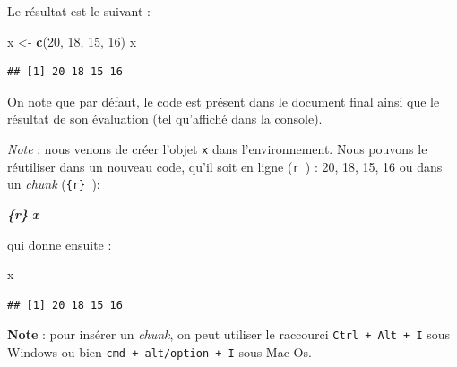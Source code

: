 \documentclass[
  11pt,
]{book}
\newenvironment{Shaded}{\begin{snugshade}}{\end{snugshade}}
\newcommand{\DecValTok}[1]{\textcolor[rgb]{0.00,0.00,0.81}{#1}}
\newcommand{\FunctionTok}[1]{\textcolor[rgb]{0.13,0.29,0.53}{\textbf{#1}}}
\newcommand{\InformationTok}[1]{\textcolor[rgb]{0.56,0.35,0.01}{\textbf{\textit{#1}}}}
\newcommand{\NormalTok}[1]{#1}
\newcommand{\OtherTok}[1]{\textcolor[rgb]{0.56,0.35,0.01}{#1}}
\numberwithin{equation}{section}
\numberwithin{countremarque}{section}
\newenvironment{notebox}{
  \begin{tcolorbox}[breakable, colback=jaune,coltext=black,
                  colframe=grisfonce]}
 {\end{tcolorbox}}
\begin{document}
Le résultat est le suivant :

\begin{Shaded}
\begin{Highlighting}[]
\NormalTok{x }\OtherTok{\textless{}{-}} \FunctionTok{c}\NormalTok{(}\DecValTok{20}\NormalTok{, }\DecValTok{18}\NormalTok{, }\DecValTok{15}\NormalTok{, }\DecValTok{16}\NormalTok{)}
\NormalTok{x}
\end{Highlighting}
\end{Shaded}

\begin{lstlisting}
## [1] 20 18 15 16
\end{lstlisting}

On note que par défaut, le code est présent dans le document final ainsi que le résultat de son évaluation (tel qu'affiché dans la console).

\emph{Note} : nous venons de créer l'objet \texttt{x} dans l'environnement. Nous pouvons le réutiliser dans un nouveau code, qu'il soit en ligne (\texttt{\textasciigrave{}r\ \textasciigrave{}}) : 20, 18, 15, 16 ou dans un \emph{chunk} (\texttt{\textasciigrave{}\textasciigrave{}\textasciigrave{}\{r\}\ \textasciigrave{}\textasciigrave{}\textasciigrave{}}):

\begin{Shaded}
\begin{Highlighting}[]
\InformationTok{\textasciigrave{}\textasciigrave{}\textasciigrave{}\{r\}}
\InformationTok{x}
\InformationTok{\textasciigrave{}\textasciigrave{}\textasciigrave{}}
\end{Highlighting}
\end{Shaded}

qui donne ensuite :

\begin{Shaded}
\begin{Highlighting}[]
\NormalTok{x}
\end{Highlighting}
\end{Shaded}

\begin{lstlisting}
## [1] 20 18 15 16
\end{lstlisting}

\begin{notebox}
\textbf{Note} : pour insérer un \emph{chunk}, on peut utiliser le raccourci \texttt{Ctrl\ +\ Alt\ +\ I} sous Windows ou bien \texttt{cmd\ +\ alt/option\ +\ I} sous Mac Os.

\end{notebox}
\end{document}

